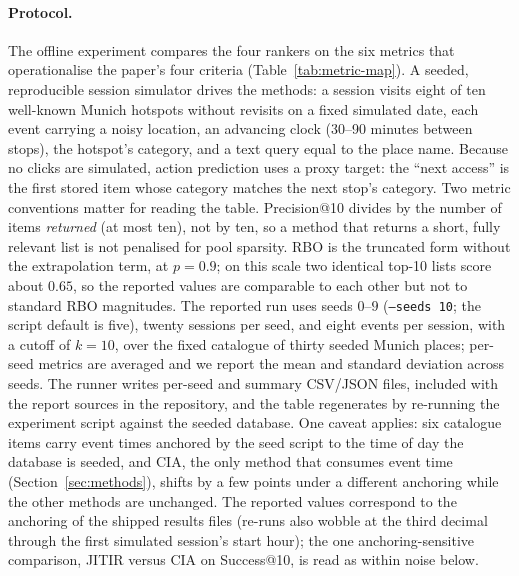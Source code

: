 \documentclass[acmlarge]{acmart}
\begin{document}
\paragraph{Protocol.}
The offline experiment compares the four rankers on the six metrics that
operationalise the paper's four criteria (Table~\ref{tab:metric-map}). A
seeded, reproducible session simulator drives the methods: a session
visits eight of ten well-known Munich hotspots without revisits on a
fixed simulated date, each event carrying a noisy location, an advancing
clock (30--90 minutes between stops), the hotspot's category, and a text
query equal to the place name. Because no clicks are simulated, action
prediction uses a proxy target: the ``next access'' is the first stored
item whose category matches the next stop's category. Two metric conventions matter for reading the table.
Precision@10 divides by the number of items \emph{returned} (at most ten),
not by ten, so a method that returns a short, fully relevant list is not
penalised for pool sparsity. RBO is the truncated form without the
extrapolation term, at $p=0.9$; on this scale two identical top-10 lists
score about $0.65$, so the reported values are comparable to each other
but not to standard RBO magnitudes. The reported run uses seeds $0$--$9$
(\texttt{--seeds 10}; the script default is five), twenty sessions per
seed, and eight events per session, with a cutoff of $k=10$, over the
fixed catalogue of thirty seeded Munich places; per-seed metrics are
averaged and we report the mean and standard deviation across seeds. The
runner writes per-seed and summary CSV/JSON files, included with the
report sources in the repository, and the table regenerates by re-running
the experiment script against the seeded database. One caveat applies:
six catalogue items carry event times anchored by the seed script to the
time of day the database is seeded, and CIA, the only method that consumes
event time (Section~\ref{sec:methods}), shifts by a few points under a
different anchoring while the other methods are unchanged. The reported
values correspond to the anchoring of the shipped results files (re-runs
also wobble at the third decimal through the first simulated session's
start hour); the one anchoring-sensitive comparison, JITIR versus CIA on
Success@10, is read as within noise below.
\end{document}
